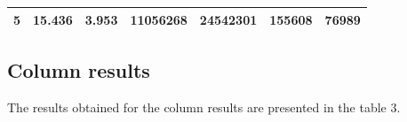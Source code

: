 \documentclass[xcolor=table]{llncs}
\begin{document}
\begin{table}[]
\begin{tabular}{ccccccc}
5                                  & 15.436                                                                                       & 3.953                                                                                        & 11056268                               & 24542301                                     & 155608                                           & 76989                                        \\ \hline
\end{tabular}
\end{table}\newline\newline
\subsection{Column results}
The results obtained for the column results are presented in the table 3.
\end{document}
